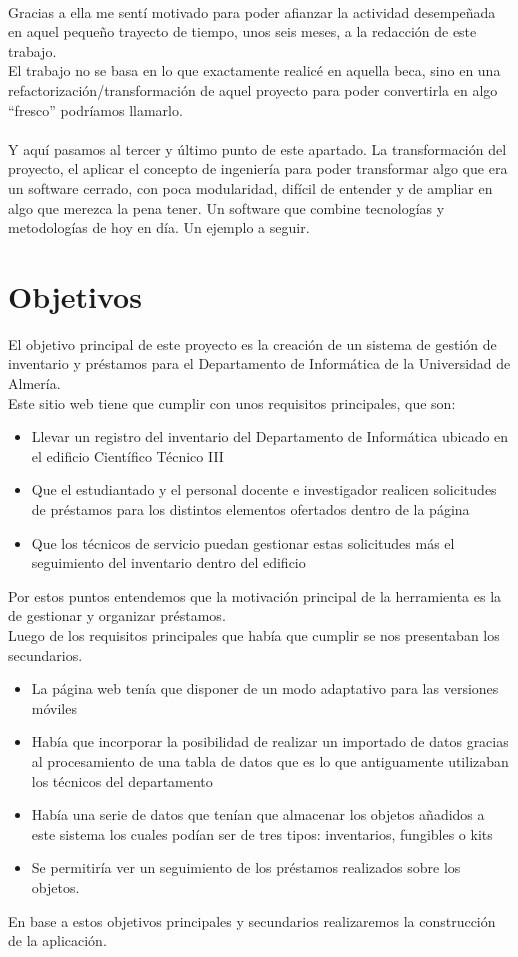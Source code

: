 \\Gracias a ella me sentí motivado para poder afianzar la actividad desempeñada en aquel pequeño trayecto de tiempo, unos seis meses, a la redacción de este trabajo.
\\El trabajo no se basa en lo que exactamente realicé en aquella beca, sino en una refactorización/transformación de aquel proyecto para poder convertirla en algo ``fresco'' podríamos llamarlo.
\\\\Y aquí pasamos al tercer y último punto de este apartado. La transformación del proyecto, el aplicar el concepto de ingeniería para poder transformar algo que era un software cerrado, con poca modularidad, difícil de entender y de ampliar en algo que merezca la pena tener. Un software que combine tecnologías y metodologías de hoy en día. Un ejemplo a seguir.

\section{Objetivos}

El objetivo principal de este proyecto es la creación de un sistema de gestión de inventario y préstamos para el Departamento de Informática de la Universidad de Almería.
\\Este sitio web tiene que cumplir con unos requisitos principales, que son:

\begin{itemize}
    \item Llevar un registro del inventario del Departamento de Informática ubicado en el edificio Científico Técnico III
    \item Que el estudiantado y el personal docente e investigador realicen solicitudes de préstamos para los distintos elementos ofertados dentro de la página
    \item Que los técnicos de servicio puedan gestionar estas solicitudes más el seguimiento del inventario dentro del edificio
\end{itemize}
Por estos puntos entendemos que la motivación principal de la herramienta es la de gestionar y organizar préstamos.
\\Luego de los requisitos principales que había que cumplir se nos presentaban los secundarios.

\begin{itemize}
    \item La página web tenía que disponer de un modo adaptativo para las versiones móviles
    \item Había que incorporar la posibilidad de realizar un importado de datos gracias al procesamiento de una tabla de datos que es lo que antiguamente utilizaban los técnicos del departamento
    \item Había una serie de datos que tenían que almacenar los objetos añadidos a este sistema los cuales podían ser de tres tipos: inventarios, fungibles o kits
    \item Se permitiría ver un seguimiento de los préstamos realizados sobre los objetos.
\end{itemize}
En base a estos objetivos principales y secundarios realizaremos la construcción de la aplicación.

